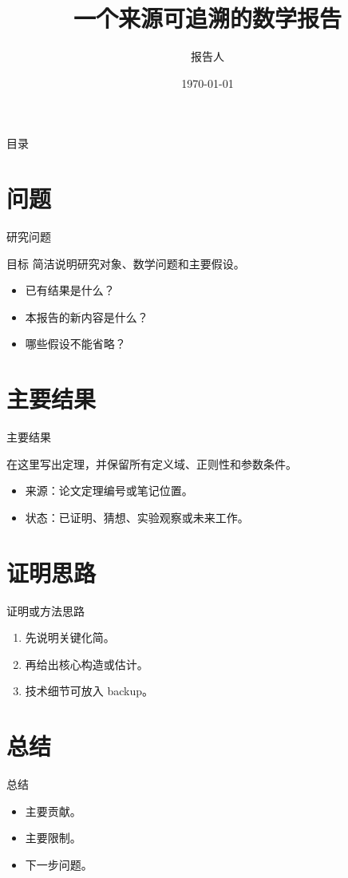 \documentclass[10pt,aspectratio=169]{ctexbeamer}
\title{一个来源可追溯的数学报告}
\author{报告人}
\institute{单位}
\date{\today}
\begin{document}
\begin{frame}
  \titlepage
\end{frame}

\begin{frame}{目录}
  \tableofcontents
\end{frame}

\section{问题}
\begin{frame}{研究问题}
  \begin{block}{目标}
    简洁说明研究对象、数学问题和主要假设。
  \end{block}
  \begin{itemize}
    \item 已有结果是什么？
    \item 本报告的新内容是什么？
    \item 哪些假设不能省略？
  \end{itemize}
\end{frame}

\section{主要结果}
\begin{frame}{主要结果}
  \begin{theorem}
    在这里写出定理，并保留所有定义域、正则性和参数条件。
  \end{theorem}
  \begin{itemize}
    \item 来源：论文定理编号或笔记位置。
    \item 状态：已证明、猜想、实验观察或未来工作。
  \end{itemize}
\end{frame}

\section{证明思路}
\begin{frame}{证明或方法思路}
  \begin{enumerate}
    \item 先说明关键化简。
    \item 再给出核心构造或估计。
    \item 技术细节可放入 backup。
  \end{enumerate}
\end{frame}

\section{总结}
\begin{frame}{总结}
  \begin{itemize}
    \item 主要贡献。
    \item 主要限制。
    \item 下一步问题。
  \end{itemize}
\end{frame}
\end{document}
